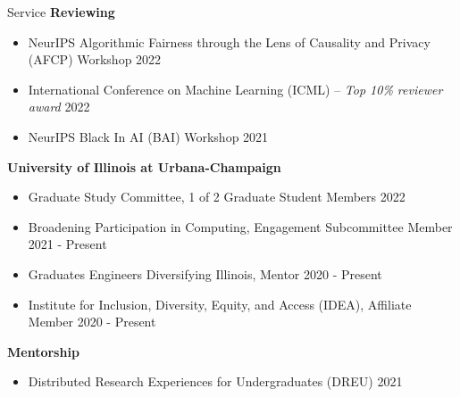 \documentclass{resume} %
\begin{document}
\begin{rSection}{Service}
\textbf{Reviewing}
\begin{itemize}[label={}]
    \setlength\itemsep{0em}
    \item NeurIPS Algorithmic Fairness through the Lens of Causality and Privacy (AFCP) Workshop \hfill 2022
    \item International Conference on Machine Learning (ICML) -- \textit{Top 10\% reviewer award} \hfill 2022
    \item NeurIPS Black In AI (BAI) Workshop \hfill 2021
\end{itemize}

\textbf{University of Illinois at Urbana-Champaign}
\begin{itemize}[label={}]
    \setlength\itemsep{0em}
    \item Graduate Study Committee, 1 of 2 Graduate Student
    Members \hfill 2022
    \item Broadening Participation in Computing, Engagement Subcommittee Member
    \hfill 2021 - Present
    \item Graduates Engineers Diversifying Illinois, Mentor \hfill
    2020 - Present
    \item Institute for Inclusion, Diversity, Equity, and
    Access (IDEA), Affiliate Member \hfill 2020 - Present
\end{itemize}

\textbf{Mentorship}
\begin{itemize}[label={}]
    \setlength\itemsep{0em}
    \item Distributed Research Experiences for Undergraduates (DREU) \hfill 2021
\end{itemize}
\end{rSection}

\end{document}

